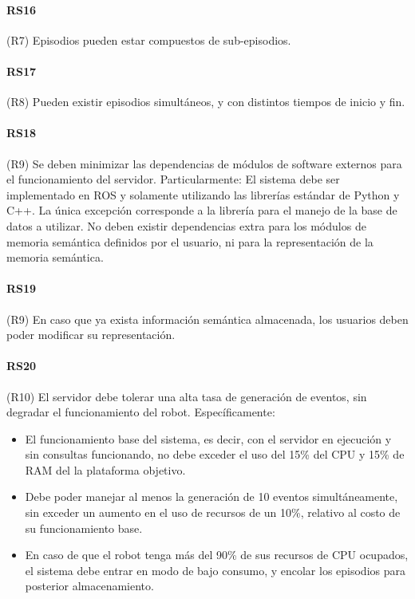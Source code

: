 \paragraph{RS16}
(R7) Episodios pueden estar compuestos de sub-episodios.

\paragraph{RS17}
(R8) Pueden existir episodios simultáneos, y con distintos tiempos de inicio y fin.

\paragraph{RS18}
(R9) Se deben minimizar las dependencias de módulos de software externos para el funcionamiento del servidor. Particularmente:
El sistema debe ser implementado en ROS y solamente utilizando las librerías estándar de Python y C++. La única excepción corresponde a la librería para el manejo de la base de datos a utilizar.
No deben existir dependencias extra para los módulos de memoria semántica definidos por el usuario, ni para la representación de la memoria semántica.

\paragraph{RS19}
(R9) En caso que ya exista información semántica almacenada, los usuarios deben poder modificar su representación.

\paragraph{RS20}
(R10) El servidor debe tolerar una alta tasa de generación de eventos, sin degradar el funcionamiento del robot. Específicamente:
\begin{itemize}
	\item El funcionamiento base del sistema, es decir, con el servidor en ejecución y sin consultas funcionando, no debe exceder el uso del 15\% del CPU y 15\% de RAM del la plataforma objetivo.
	\item Debe poder manejar al menos la generación de 10 eventos simultáneamente, sin exceder un aumento en el uso de recursos de un 10\%, relativo al costo de su funcionamiento base.
	\item En caso de que el robot tenga más del 90\% de sus recursos de CPU ocupados, el sistema debe entrar en modo de bajo consumo, y encolar los episodios para posterior almacenamiento.
\end{itemize}

